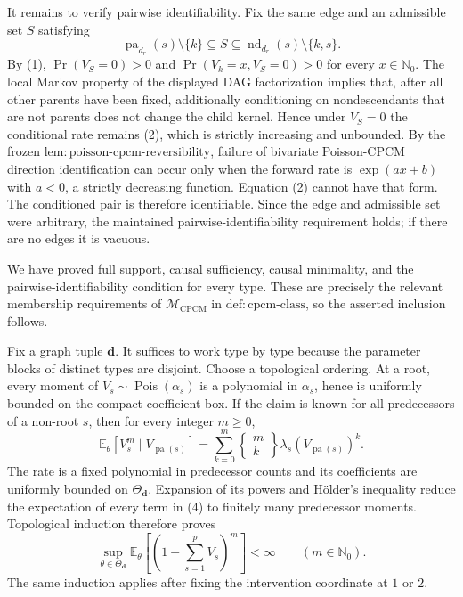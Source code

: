 It remains to verify pairwise identifiability.  Fix the same edge and an admissible set \(S\) satisfying
\[
 \operatorname{pa}_{d_r}(s)\setminus\{k\}
 \subseteq S\subseteq
 \operatorname{nd}_{d_r}(s)\setminus\{k,s\}.
\]
By (1), \(\Pr(V_S=0)>0\) and
\(\Pr(V_k=x,V_S=0)>0\) for every \(x\in\mathbb N_0\).  The local Markov property of the displayed DAG factorization implies that, after all other parents have been fixed, additionally conditioning on nondescendants that are not parents does not change the child kernel.  Hence under \(V_S=0\) the conditional rate remains (2), which is strictly increasing and unbounded.  By the frozen \(\mathrm{lem{:}poisson\text{-}cpcm\text{-}reversibility}\), failure of bivariate Poisson-CPCM direction identification can occur only when the forward rate is \(\exp(ax+b)\) with \(a<0\), a strictly decreasing function.  Equation (2) cannot have that form.  The conditioned pair is therefore identifiable.  Since the edge and admissible set were arbitrary, the maintained pairwise-identifiability requirement holds; if there are no edges it is vacuous.

We have proved full support, causal sufficiency, causal minimality, and the pairwise-identifiability condition for every type.  These are precisely the relevant membership requirements of \(\mathcal M_{\mathrm{CPCM}}\) in \(\mathrm{def{:}cpcm\text{-}class}\), so the asserted inclusion follows.

Fix a graph tuple \(\boldsymbol d\).  It suffices to work type by type because the parameter blocks of distinct types are disjoint.  Choose a topological ordering.  At a root, every moment of \(V_s\sim\operatorname{Pois}(\alpha_s)\) is a polynomial in \(\alpha_s\), hence is uniformly bounded on the compact coefficient box.  If the claim is known for all predecessors of a non-root \(s\), then for every integer \(m\geq0\),
\[
 \mathbb E_\theta[V_s^m\mid V_{\operatorname{pa}(s)}]
 =\sum_{k=0}^{m}
 \left\{\begin{matrix}m\\ k\end{matrix}\right\}
 \lambda_s(V_{\operatorname{pa}(s)})^k. \tag{4}
\]
The rate is a fixed polynomial in predecessor counts and its coefficients are uniformly bounded on \(\Theta_{\boldsymbol d}\).  Expansion of its powers and H\"older's inequality reduce the expectation of every term in (4) to finitely many predecessor moments.  Topological induction therefore proves
\[
 \sup_{\theta\in\Theta_{\boldsymbol d}}
 \mathbb E_\theta\!\left[\left(1+\sum_{s=1}^pV_s\right)^m\right]<\infty
 \qquad(m\in\mathbb N_0). \tag{5}
\]
The same induction applies after fixing the intervention coordinate at \(1\) or \(2\).

